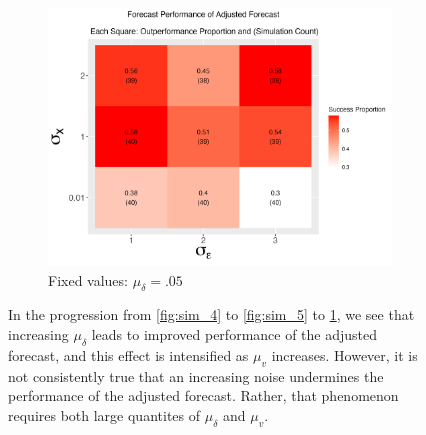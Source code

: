 \documentclass[11pt]{article}
\theoremstyle{definition}
\begin{document}
\begin{figure}[!h]
    \begin{subfigure}{.44\linewidth} 
      \centering
        \includegraphics[scale=.42]{simulation_plots/Nov27_160346_2024_sigmax_sigmaepsilon.png}
        \caption{Fixed values: $\mu_{\delta}=.05$}\label{fig:sim_6}
    \end{subfigure}
    
        \caption{In the progression from \ref{fig:sim_4} to \ref{fig:sim_5} to \ref{fig:sim_6}, we see that increasing $\mu_{\delta}$ leads to improved performance of the adjusted forecast, and this effect is intensified as $\mu_{v}$ increases.  However, it is not consistently true that an increasing noise undermines the performance of the adjusted forecast.  Rather, that phenomenon requires both large quantites of $\mu_{\delta}$ and $\mu_{v}$.}
        \label{fig:set_of_three_two}
      \end{figure}
  
\end{document}
